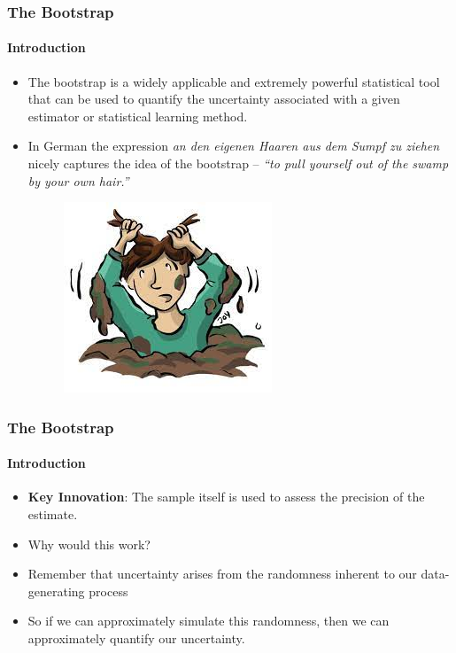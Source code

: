 \documentclass[
  shownotes,
  xcolor={svgnames},
  hyperref={colorlinks,citecolor=DarkBlue,linkcolor=andesred,urlcolor=DarkBlue}
  , aspectratio=169]{beamer}
\begin{document}
\begin{frame}[fragile]
\frametitle{The Bootstrap}
\framesubtitle{Introduction}

\begin{itemize}
  \item The bootstrap is a widely applicable and extremely powerful statistical tool that can be used to quantify the uncertainty associated with a given estimator or statistical learning method. 
  \medskip
  \item In German the expression {\it an den eigenen Haaren aus dem Sumpf zu ziehen} nicely captures the idea of the bootstrap – {\it ``to pull yourself out of the swamp  by your own hair.''} 

\medskip

\begin{figure}
  \includegraphics[scale=.3]{figures/pelos.jpg}
\end{figure}
\end{itemize}

 \end{frame}
\begin{frame}[fragile]
\frametitle{The Bootstrap}
\framesubtitle{Introduction}
\begin{itemize}
\item {\bf Key Innovation}: The sample itself is used to assess the precision of the estimate. 
  \medskip
  \item Why would this work? 
  \medskip
  \item Remember that uncertainty arises from the randomness inherent to our data-generating process 
  \medskip
  \item So if we can approximately simulate this randomness, then we can approximately quantify our uncertainty.
  
\end{itemize}



 \end{frame}
\end{document}
